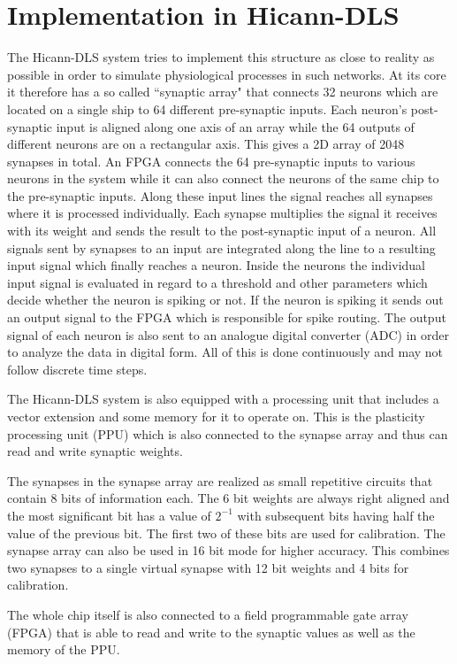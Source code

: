 \section{Implementation in Hicann-DLS}
The Hicann-DLS system tries to implement this structure as close to reality as possible in order to simulate physiological processes in such networks.
At its core it therefore has a so called ``synaptic array" that connects 32 neurons which are located on a single ship to 64 different pre-synaptic inputs.
Each neuron's post-synaptic input is aligned along one axis of an array while the 64 outputs of different neurons are on a rectangular axis.
This gives a 2D array of 2048 synapses in total.
An FPGA connects the 64 pre-synaptic inputs to various neurons in the system while it can also connect the neurons of the same chip to the pre-synaptic inputs.
Along these input lines the signal reaches all synapses where it is processed individually.
Each synapse multiplies the signal it receives with its weight and sends the result to the post-synaptic input of a neuron.
All signals sent by synapses to an input are integrated along the line to a resulting input signal which finally reaches a neuron.
Inside the neurons the individual input signal is evaluated in regard to a threshold and other parameters which decide whether the neuron is spiking or not.
If the neuron is spiking it sends out an output signal to the FPGA which is responsible for spike routing.
The output signal of each neuron is also sent to an analogue digital converter (ADC) in order to analyze the data in digital form.
All of this is done continuously and may not follow discrete time steps.

The Hicann-DLS system is also equipped with a processing unit that includes a vector extension and some memory for it to operate on.
This is the plasticity processing unit (PPU) which is also connected to the synapse array and thus can read and write synaptic weights.

The synapses in the synapse array are realized as small repetitive circuits that contain 8 bits of information each.
The 6 bit weights are always right aligned and the most significant bit has a value of $2^{-1}$ with subsequent bits having half the value of the previous bit.
The first two of these bits are used for calibration.
The synapse array can also be used in 16 bit mode for higher accuracy.
This combines two synapses to a single virtual synapse with 12 bit weights and 4 bits for calibration.

The whole chip itself is also connected to a field programmable gate array (FPGA) that is able to read and write to the synaptic values as well as the memory of the PPU.

